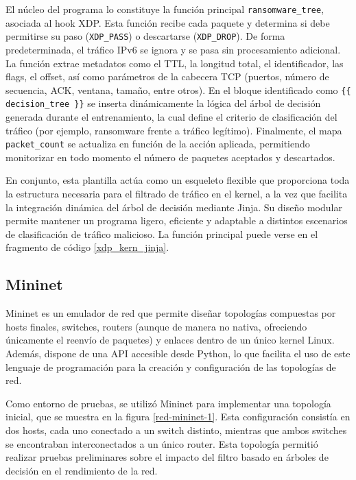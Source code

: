 El núcleo del programa lo constituye la función principal \verb|ransomware_tree|, asociada al hook XDP. Esta función recibe cada paquete y determina si debe permitirse su paso (\verb|XDP_PASS|) o descartarse (\verb|XDP_DROP|). De forma predeterminada, el tráfico IPv6 se ignora y se pasa sin procesamiento adicional. La función extrae metadatos como el TTL, la longitud total, el identificador, las flags, el offset, así como parámetros de la cabecera TCP (puertos, número de secuencia, ACK, ventana, tamaño, entre otros). En el bloque identificado como \verb|{{ decision_tree }}| se inserta dinámicamente la lógica del árbol de decisión generada durante el entrenamiento, la cual define el criterio de clasificación del tráfico (por ejemplo, ransomware frente a tráfico legítimo). Finalmente, el mapa \verb|packet_count| se actualiza en función de la acción aplicada, permitiendo monitorizar en todo momento el número de paquetes aceptados y descartados.

En conjunto, esta plantilla actúa como un esqueleto flexible que proporciona toda la estructura necesaria para el filtrado de tráfico en el kernel, a la vez que facilita la integración dinámica del árbol de decisión mediante Jinja. Su diseño modular permite mantener un programa ligero, eficiente y adaptable a distintos escenarios de clasificación de tráfico malicioso. La función principal puede verse en el fragmento de código \ref{xdp_kern_jinja}.


\subsection{Mininet}

Mininet es un emulador de red que permite diseñar topologías compuestas por hosts finales, switches, routers (aunque de manera no nativa, ofreciendo únicamente el reenvío de paquetes) y enlaces dentro de un único kernel Linux. Además, dispone de una API accesible desde Python, lo que facilita el uso de este lenguaje de programación para la creación y configuración de las topologías de red\cite{lantz2021mininet}.

Como entorno de pruebas, se utilizó Mininet para implementar una topología inicial, que se muestra en la figura \ref{red-mininet-1}. Esta configuración consistía en dos hosts, cada uno conectado a un switch distinto, mientras que ambos switches se encontraban interconectados a un único router. Esta topología permitió realizar pruebas preliminares sobre el impacto del filtro basado en árboles de decisión en el rendimiento de la red.

